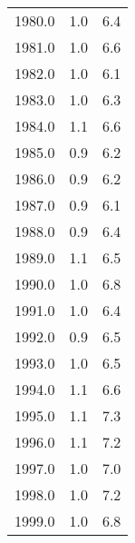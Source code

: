 \begin{tabular}{ccc}
\hline
1980.0 & 1.0 & 6.4 \\
1981.0 & 1.0 & 6.6 \\
1982.0 & 1.0 & 6.1 \\
1983.0 & 1.0 & 6.3 \\
1984.0 & 1.1 & 6.6 \\
1985.0 & 0.9 & 6.2 \\
1986.0 & 0.9 & 6.2 \\
1987.0 & 0.9 & 6.1 \\
1988.0 & 0.9 & 6.4 \\
1989.0 & 1.1 & 6.5 \\
1990.0 & 1.0 & 6.8 \\
1991.0 & 1.0 & 6.4 \\
1992.0 & 0.9 & 6.5 \\
1993.0 & 1.0 & 6.5 \\
1994.0 & 1.1 & 6.6 \\
1995.0 & 1.1 & 7.3 \\
1996.0 & 1.1 & 7.2 \\
1997.0 & 1.0 & 7.0 \\
1998.0 & 1.0 & 7.2 \\
1999.0 & 1.0 & 6.8 \\
\hline
\end{tabular}
